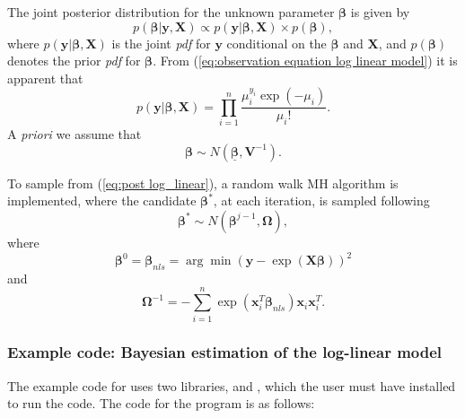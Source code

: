 \documentclass[article]{jss}
\begin{document}
The joint posterior distribution for the unknown parameter
$\bm{\beta}$ is given by
\begin{equation}
  p(\bm{\beta}|\bm{y},\bm{X})\propto p(\bm{y}|\bm{\beta},\bm{X})\times
  p(\bm{\beta}),
\label{eq:post log_linear}
\end{equation} 
where $p(\bm{y}|\bm{\beta},\bm{X})$ is the joint \emph{pdf }for
$\bm{y}$ conditional on the $\bm{\beta}$ and $\bm{X}$, and
$p(\bm{\beta})$ denotes the prior \emph{pdf }for $\bm{\beta}.$ From
(\ref{eq:observation equation log linear model}) it is apparent that\[
p(\bm{y}|\bm{\beta},\bm{X})=\prod_{i=1}^{n}\frac{\mu_{i}^{y_{i}}\exp(-\mu_{i})}{\mu_{i}!}.\]
A \emph{priori }we assume that \[ \bm{\beta}\sim
N(\bm{\underline{\bm{\beta}}},\bm{V}^{-1}).\]

To sample from (\ref{eq:post log_linear}), a random walk MH algorithm
is implemented, where the candidate $\bm{\beta}^{*}$, at each
iteration, is sampled following \begin{equation} \bm{\beta}^{*}\sim
  N\left(\bm{\beta}^{j-1},\bm{\Omega}\right),\label{eq:candidate
    log-linear}\end{equation} where\[
\bm{\beta}^{0}=\bm{\beta}_{nls}=\arg\min\left(\bm{y}-\exp\left(\bm{X}\bm{\beta}\right)\right)^{2}\]
and\[
\bm{\Omega}^{-1}=-\sum_{i=1}^{n}\exp\left(\bm{x}_{i}^{T}\bm{\beta}_{nls}\right)\bm{x}_{i}\bm{x}_{i}^{T}.\]



\subsubsection{Example code: Bayesian estimation of the log-linear model}

The example code for  uses two 
libraries,  and , which the user must have
installed to run the code.  The code for the program is as follows:
\end{document}
